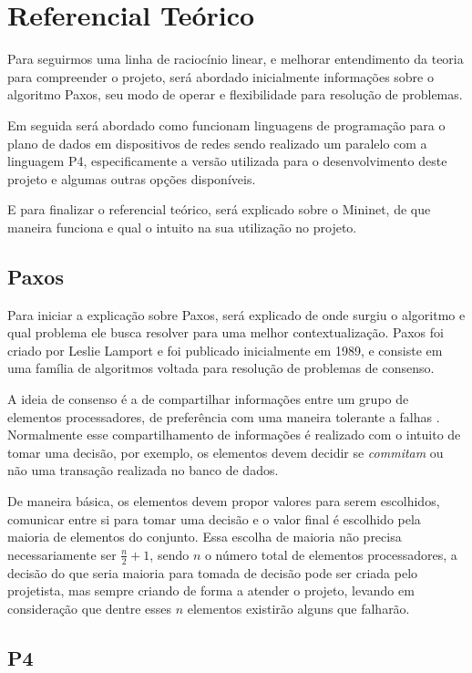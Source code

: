 \documentclass[12pt,
openright, 
oneside,
a4paper,
brazil]{facom-ufu-abntex2}
\begin{document}
\section{Referencial Teórico}
Para seguirmos uma linha de raciocínio linear, e melhorar entendimento da teoria
para compreender o projeto, será abordado inicialmente informações sobre o 
algoritmo Paxos, seu modo de operar e flexibilidade para resolução de problemas.

Em seguida será abordado como funcionam linguagens de programação para o plano de
dados em dispositivos de redes sendo realizado um paralelo com a linguagem P4, 
especificamente a versão utilizada para o desenvolvimento deste projeto e algumas
outras opções disponíveis.

E para finalizar o referencial teórico, será explicado sobre o Mininet, de que
maneira funciona e qual o intuito na sua utilização no projeto.

\subsection{Paxos}
Para iniciar a explicação sobre Paxos, será explicado de onde surgiu o algoritmo e qual
problema ele busca resolver para uma melhor contextualização. Paxos foi criado por 
Leslie Lamport e foi publicado inicialmente em 1989, e consiste em uma família de algoritmos
voltada para resolução de problemas de consenso. 

A ideia de consenso é a de compartilhar informações entre um grupo de elementos
processadores, de preferência com uma maneira tolerante a falhas \citep{barborak1993consensus}.
Normalmente esse compartilhamento de informações é realizado com o intuito de tomar
uma decisão, por exemplo, os elementos devem decidir se \textit{commitam} ou não
uma transação realizada no banco de dados. 

De maneira básica, os elementos devem propor valores para serem escolhidos, comunicar entre
si para tomar uma decisão e o valor final é escolhido pela maioria de elementos do conjunto.
Essa escolha de maioria não precisa necessariamente ser $\frac{n}{2}+1$, sendo $n$ o número
total de elementos processadores, a decisão do que seria maioria para tomada de decisão
pode ser criada pelo projetista, mas sempre criando de forma a atender o projeto, levando
em consideração que dentre esses $n$ elementos existirão alguns que falharão.



\subsection{P4}
\end{document}
